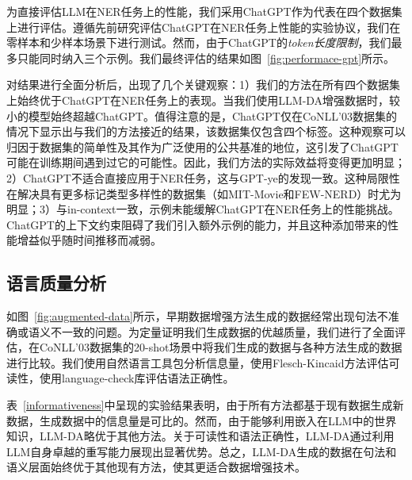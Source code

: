 \documentclass[supercite]{Experimental_Report}
\theoremstyle{definition}
\begin{document}
为直接评估LLM在NER任务上的性能，我们采用ChatGPT作为代表在四个数据集上进行评估。遵循先前研究评估ChatGPT在NER任务上性能的实验协议，我们在零样本和少样本场景下进行测试。然而，由于ChatGPT的\emph{token长度限制}，我们最多只能同时纳入三个示例。我们最终评估的结果如图~\ref{fig:performace-gpt}所示。

对结果进行全面分析后，出现了几个关键观察：1）我们的方法在所有四个数据集上始终优于ChatGPT在NER任务上的表现。当我们使用LLM-DA增强数据时，较小的模型始终超越ChatGPT。值得注意的是，ChatGPT仅在CoNLL'03数据集的情况下显示出与我们的方法接近的结果，该数据集仅包含四个标签。这种观察可以归因于数据集的简单性及其作为广泛使用的公共基准的地位，这引发了ChatGPT可能在训练期间遇到过它的可能性。因此，我们方法的实际效益将变得更加明显；2）ChatGPT不适合直接应用于NER任务，这与GPT-ye的发现一致\cite{GPT-ye,Stanford}。这种局限性在解决具有更多标记类型多样性的数据集（如MIT-Movie和FEW-NERD）时尤为明显；3）与in-context一致\cite{in-context}，示例未能缓解ChatGPT在NER任务上的性能挑战。ChatGPT的上下文约束阻碍了我们引入额外示例的能力，并且这种添加带来的性能增益似乎随时间推移而减弱。

\subsection{语言质量分析}

\begin{table}[!t]
    \centering
    \caption{增强数据的语言质量。}
    \label{informativeness}
\end{table}

如图~\ref{fig:augmented-data}所示，早期数据增强方法生成的数据经常出现句法不准确或语义不一致的问题。为定量证明我们生成数据的优越质量，我们进行了全面评估，在CoNLL'03数据集的20-shot场景中将我们生成的数据与各种方法生成的数据进行比较。我们使用自然语言工具包分析信息量，使用Flesch-Kincaid方法评估可读性，使用language-check库评估语法正确性。

表~\ref{informativeness}中呈现的实验结果表明，由于所有方法都基于现有数据生成新数据，生成数据中的信息量是可比的。然而，由于能够利用嵌入在LLM中的世界知识\cite{World-knowledge}，LLM-DA略优于其他方法。关于可读性和语法正确性，LLM-DA通过利用LLM自身卓越的重写能力展现出显著优势。总之，LLM-DA生成的数据在句法和语义层面始终优于其他现有方法，使其更适合数据增强技术。
\end{document}
